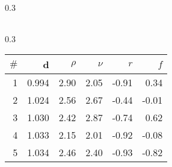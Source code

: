 \documentclass[uplatex,11pt,openany]{ujreport}
\begin{document}
\begin{landscape}
\begin{table*}[tb]
\begin{subtable}[h]{0.3\textwidth}
\begin{tabular}{rrrrrr}
                    \bottomrule
                    \end{tabular}
                    \end{subtable}\hfill\begin{subtable}[h]{0.3\textwidth}
                    \centering
                    \caption{MIXI}
                    \label{table:best_genes_for_mixi}
                    \begin{tabular}{rrrrrr}
                    \toprule
                    $\#$ & d & $\rho$ & $\nu$ & $r$ & $f$ \\
                    \midrule
                    \color{black} 1 & \color{black} 0.994 & {\cellcolor[HTML]{F5FBF6}} \color[HTML]{000000} \color{black} 2.90 & {\cellcolor[HTML]{FAFDFA}} \color[HTML]{000000} \color{black} 2.05 & {\cellcolor[HTML]{FFFAFA}} \color[HTML]{000000} \color{black} -0.91 & {\cellcolor[HTML]{FDADAD}} \color[HTML]{000000} \color{black} 0.34 \\
                    \color{black} 2 & \color{black} 1.024 & {\cellcolor[HTML]{F7FCF8}} \color[HTML]{000000} \color{black} 2.56 & {\cellcolor[HTML]{F6FCF7}} \color[HTML]{000000} \color{black} 2.67 & {\cellcolor[HTML]{FEDDDD}} \color[HTML]{000000} \color{black} -0.44 & {\cellcolor[HTML]{FEC2C2}} \color[HTML]{000000} \color{black} -0.01 \\
                    \color{black} 3 & \color{black} 1.030 & {\cellcolor[HTML]{F8FCF8}} \color[HTML]{000000} \color{black} 2.42 & {\cellcolor[HTML]{F5FBF6}} \color[HTML]{000000} \color{black} 2.87 & {\cellcolor[HTML]{FFEFEF}} \color[HTML]{000000} \color{black} -0.74 & {\cellcolor[HTML]{FD9B9B}} \color[HTML]{000000} \color{black} 0.62 \\
                    \color{black} 4 & \color{black} 1.033 & {\cellcolor[HTML]{F9FDF9}} \color[HTML]{000000} \color{black} 2.15 & {\cellcolor[HTML]{FAFDFA}} \color[HTML]{000000} \color{black} 2.01 & {\cellcolor[HTML]{FFFBFB}} \color[HTML]{000000} \color{black} -0.92 & {\cellcolor[HTML]{FEC7C7}} \color[HTML]{000000} \color{black} -0.08 \\
                    \color{black} 5 & \color{black} 1.034 & {\cellcolor[HTML]{F8FCF8}} \color[HTML]{000000} \color{black} 2.46 & {\cellcolor[HTML]{F8FCF8}} \color[HTML]{000000} \color{black} 2.40 & {\cellcolor[HTML]{FFFBFB}} \color[HTML]{000000} \color{black} -0.93 & {\cellcolor[HTML]{FFF4F4}} \color[HTML]{000000} \color{black} -0.82 \\
                    \bottomrule
                    \end{tabular}
                \end{subtable}\hfill\end{table*}
            \end{landscape}
\end{document}
